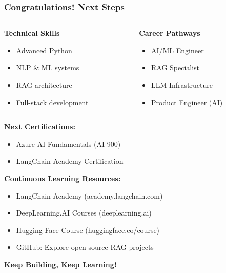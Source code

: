 \begin{frame}[fragile]\frametitle{Congratulations! Next Steps}
\begin{columns}
    \begin{column}[T]{0.5\linewidth}
      \textbf{Technical Skills}
      \begin{itemize}
        \item Advanced Python
        \item NLP \& ML systems
        \item RAG architecture
        \item Full-stack development
      \end{itemize}
    \end{column}
    \begin{column}[T]{0.5\linewidth}
      \textbf{Career Pathways}
      \begin{itemize}
        \item AI/ML Engineer
        \item RAG Specialist
        \item LLM Infrastructure
        \item Product Engineer (AI)
      \end{itemize}
    \end{column}
  \end{columns}
  
  \vspace{0.3cm}
  \textbf{Next Certifications:}
  \begin{itemize}
    \item Azure AI Fundamentals (AI-900)
    \item LangChain Academy Certification
  \end{itemize}
  
\textbf{Continuous Learning Resources:}
\begin{itemize}
  \item LangChain Academy (academy.langchain.com)
  \item DeepLearning.AI Courses (deeplearning.ai)
  \item Hugging Face Course (huggingface.co/course)
  \item GitHub: Explore open source RAG projects
\end{itemize}
  
  \vspace{0.3cm}
  \textbf{Keep Building, Keep Learning!}
\end{frame}

